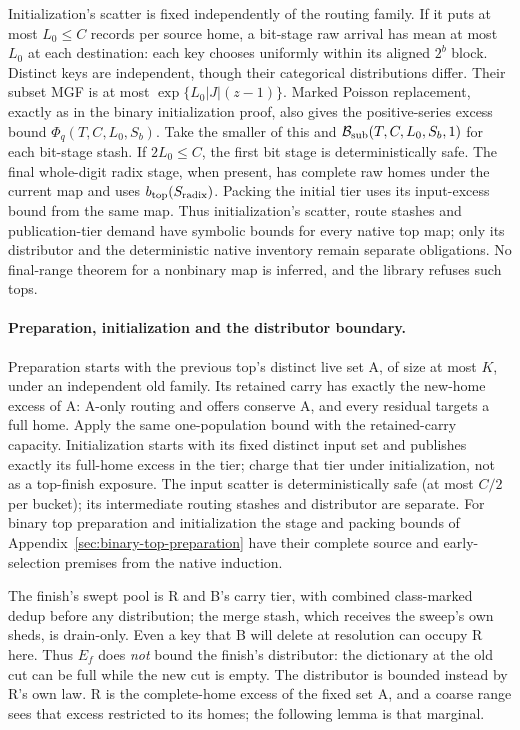 \documentclass[11pt]{article}
\theoremstyle{definition}
\theoremstyle{remark}
\begin{document}
Initialization's scatter is fixed independently of the routing family.
If it puts at most $L_0\le C$ records per source home, a bit-stage raw
arrival has mean at most $L_0$ at each destination: each key chooses
uniformly within its aligned $2^b$ block. Distinct keys are independent,
though their categorical distributions differ. Their subset MGF is at
most $\exp\{L_0|J|(z-1)\}$. Marked Poisson replacement, exactly as in the
binary initialization proof, also gives the positive-series excess bound
$\Phi_q(T,C,L_0,S_b)$. Take the smaller of this and
$\mathcal B_{\rm sub}(T,C,L_0,S_b,1)$ for each bit-stage stash. If
$2L_0\le C$, the first bit stage is deterministically safe. The final
whole-digit radix stage, when present, has complete raw homes under the
current map and uses $b_{\rm top}(S_{\rm radix})$. Packing the initial
tier uses its input-excess bound from the same map. Thus initialization's
scatter, route stashes and publication-tier demand have symbolic bounds
for every native top map; only its distributor and the deterministic
native inventory remain separate obligations. No final-range theorem
for a nonbinary map is inferred, and the library refuses such tops.

\paragraph{Preparation, initialization and the distributor boundary.}
Preparation starts with the previous top's distinct live set A, of size
at most $K$, under an independent old family. Its retained carry has
exactly the new-home excess of A: A-only routing and offers conserve A,
and every residual targets a full home. Apply the same one-population
bound with the retained-carry capacity. Initialization starts with its
fixed distinct input set and publishes exactly its full-home excess in
the tier; charge that tier under initialization, not as a top-finish
exposure. The input scatter is deterministically safe (at most $C/2$ per
bucket); its intermediate routing stashes and distributor are separate.
For binary top preparation and initialization the stage and packing
bounds of Appendix~\ref{sec:binary-top-preparation} have their complete
source and early-selection premises from the native induction.

The finish's swept pool is R and B's carry tier, with combined
class-marked dedup before any distribution; the merge stash, which receives
the sweep's own sheds, is drain-only. Even a key
that B will delete at resolution can occupy R here. Thus $E_f$ does
\emph{not} bound the finish's distributor: the dictionary at the old cut can
be full while the new cut is empty. The distributor is bounded instead by
R's own law. R is the complete-home excess of the fixed set A, and a coarse
range sees that excess restricted to its homes; the following lemma is
that marginal.
\end{document}
